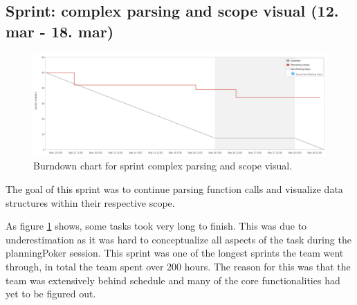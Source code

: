 \subsection{Sprint: complex parsing and scope visual (12. mar - 18. mar)}     \label{subsection:SprintComplexParsingAndScopeVisual}
\begin{figure}[H] 
    \includegraphics[width=\textwidth]{inc/images/sprints/sprintComplexParsingAndScopeVisual120319-180319.png}
    \caption{Burndown chart for sprint complex parsing and scope visual.}
    \label{fig:sprintComplexParsingAndScopeVisual}
\end{figure}

The goal of this \gls{sprint} was to continue parsing function calls and visualize data structures within their respective scope.

As figure \ref{fig:sprintComplexParsingAndScopeVisual} shows, some tasks took very long to finish. This was due to underestimation as it was hard to conceptualize all aspects of the task during the \gls{planningPoker} session. This \gls{sprint} was one of the longest \glspl{sprint} the team went through, in total the team spent over 200 hours. The reason for this was that the team was extensively behind schedule and many of the core functionalities had yet to be figured out.

